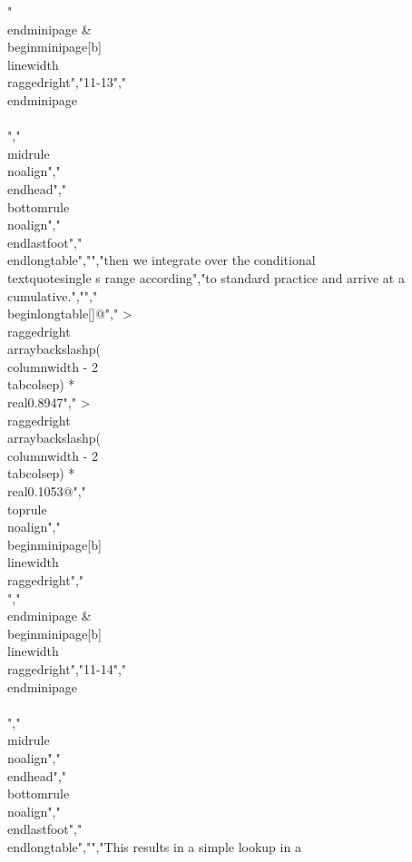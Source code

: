 {{{{{{{"\\end{minipage} & \\begin{minipage}[b]{\\linewidth}\\raggedright","11-13","\\end{minipage} \\\\","\\midrule\\noalign{}","\\endhead","\\bottomrule\\noalign{}","\\endlastfoot","\\end{longtable}","","then we integrate over the conditional\\textquotesingle s range according","to standard practice and arrive at a cumulative.","","\\begin{longtable}[]{@{}","  >{\\raggedright\\arraybackslash}p{(\\columnwidth - 2\\tabcolsep) * \\real{0.8947}}","  >{\\raggedright\\arraybackslash}p{(\\columnwidth - 2\\tabcolsep) * \\real{0.1053}}@{}}","\\toprule\\noalign{}","\\begin{minipage}[b]{\\linewidth}\\raggedright","\\[P(E) = \\int_{0}^{\\infty}{P\\left( E \\middle| E_{i} \\right)p\\left( E_{i} \\right)dE_{i}}\\]","\\end{minipage} & \\begin{minipage}[b]{\\linewidth}\\raggedright","11-14","\\end{minipage} \\\\","\\midrule\\noalign{}","\\endhead","\\bottomrule\\noalign{}","\\endlastfoot","\\end{longtable}","","This results in a simple lookup in a }}}}}}}
